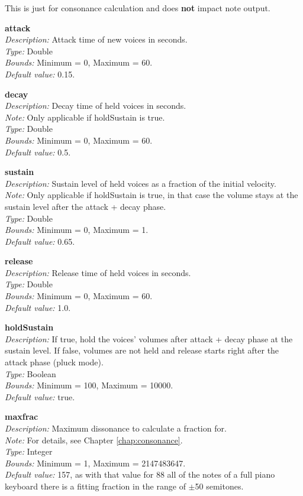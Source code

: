 \documentclass[12pt,a4paper,titlepage,oneside]{report}
\begin{document}
This is just for consonance calculation and does \textbf{not} impact note output.

\noindent
\textbf{attack} \\
\textit{Description:} Attack time of new voices in seconds. \\
\textit{Type:} Double \\
\textit{Bounds:} Minimum = 0, Maximum = 60. \\
\textit{Default value:} 0.15.

\noindent
\textbf{decay} \\
\textit{Description:} Decay time of held voices in seconds. \\
\textit{Note:} Only applicable if holdSustain is true. \\
\textit{Type:} Double \\
\textit{Bounds:} Minimum = 0, Maximum = 60. \\
\textit{Default value:} 0.5.

\noindent
\textbf{sustain} \\
\textit{Description:} Sustain level of held voices as a fraction of the initial velocity. \\
\textit{Note:} Only applicable if holdSustain is true, in that case the volume stays at the sustain level after the attack + decay phase. \\
\textit{Type:} Double \\
\textit{Bounds:} Minimum = 0, Maximum = 1. \\
\textit{Default value:} 0.65.

\noindent
\textbf{release} \\
\textit{Description:} Release time of held voices in seconds. \\
\textit{Type:} Double \\
\textit{Bounds:} Minimum = 0, Maximum = 60. \\
\textit{Default value:} 1.0.

\noindent
\textbf{holdSustain} \\
\textit{Description:} If true, hold the voices' volumes after attack + decay phase at the sustain level. If false, volumes are not held and release starts right after the attack phase (pluck mode). \\
\textit{Type:} Boolean \\
\textit{Bounds:} Minimum = 100, Maximum = 10000. \\
\textit{Default value:} true.

\noindent
\textbf{maxfrac} \\
\textit{Description:} Maximum dissonance to calculate a fraction for. \\
\textit{Note:} For details, see Chapter \ref{chap:consonance}. \\
\textit{Type:} Integer \\
\textit{Bounds:} Minimum = 1, Maximum = 2147483647. \\
\textit{Default value:} 157, as with that value for 88 all of the notes of a full piano keyboard there is a fitting fraction in the range of $\pm$50 semitones.
\end{document}
